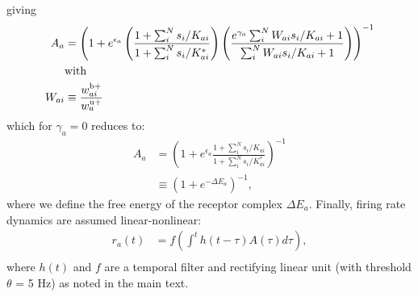 \documentclass[9pt,twoside,lineno]{pnas-new}
\begin{document}
giving
\begin{align}
A_a &= \left(1 + e^{\epsilon_{a}}\left(\frac{1 + \sum_i^N s_i/K_{ai}}{1 + \sum_i^N s_i/K^*_{ai}}\right)
\left(\frac{e^{\gamma_a}\sum_i^N W_{ai}s_i/K_{ai} + 1}{\sum_i^N W_{ai}s_i/K_{ai} + 1} \right)\right)^{-1} \nonumber \\
&\textup{with} \nonumber \\
W_{ai} &\equiv \frac{w_{ai}^{{\textup b}+}}{w_a^{{\textup u}+}} 
\end{align}
which for $\gamma_a = 0$ reduces to:
\begin{align}
A_a &= \left(1 + e^{\epsilon_{a}}\frac{1 + \sum_i^N s_i/K_{ai}}{1 + \sum_i^N s_i/K^*_{ai}}\right)^{-1} \nonumber \\
&\equiv \left(1 + e^{-\Delta E_{a}}\right)^{-1},
\label{eq:steady_state_act}
\end{align}
where we define the free energy of the receptor complex $\Delta E_a$. Finally, firing rate dynamics are assumed linear-nonlinear:
\begin{align}
r_a(t) &= f\left(\int^t h(t - \tau) A(\tau) d\tau\right) \label{eq:firing_machinery},\\
\end{align}
where $h(t)$ and $f$ are a temporal filter and rectifying linear unit (with threshold $\theta$ = 5 Hz) as noted in the main text.
\fi










\iffalse
\end{document}
